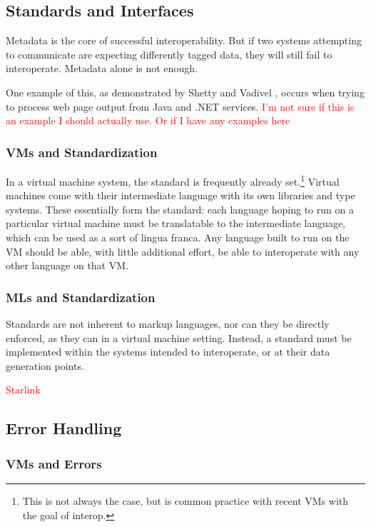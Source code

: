 \documentclass{sig-alternate}
\newcommand{\mycomment}[1]{\textcolor{red}{#1}}
\begin{document}
\subsection{Standards and Interfaces} \cite{Shetty:2009}
Metadata is the core of successful interoperability. But if two systems attempting to communicate are expecting differently tagged data, they will still fail to interoperate. Metadata alone is not enough.

One example of this, as demonstrated by Shetty and Vadivel \cite{Shetty:2009}, occurs when trying to process web page output from Java and .NET services. \mycomment{I'm not sure if this is an example I should actually use. Or if I have any examples here}

\subsubsection*{VMs and Standardization}
In a virtual machine system, the standard is frequently already set.\footnote{This is not always the case, but is common practice with recent VMs with the goal of interop.} Virtual machines come with their intermediate language with its own libraries and type systems. These essentially form the standard: each language hoping to run on a particular virtual machine must be translatable to the intermediate language, which can be used as a sort of lingua franca. Any language built to run on the VM should be able, with little additional effort, be able to interoperate with any other language on that VM.


\subsubsection*{MLs and Standardization}
Standards are not inherent to markup languages, nor can they be directly enforced, as they can in a virtual machine setting. Instead, a standard must be implemented within the systems intended to interoperate, or at their data generation points.

\mycomment{Starlink}



\subsection{Error Handling}

\subsubsection*{VMs and Errors}
\end{document}
